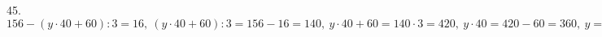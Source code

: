 45. $156-(y\cdot40+60):3=16,\ (y\cdot40+60):3=156-16=140,\ y\cdot40+60=140\cdot3=420,\ y\cdot40=420-60=360,\ y=360:40=9.$\\
